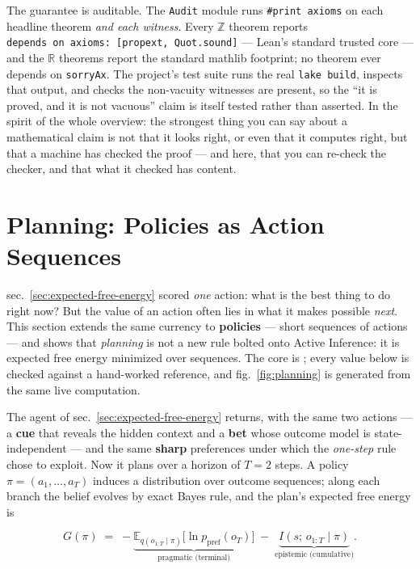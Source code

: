 \documentclass[
  english,
]{article}
\begin{document}
The guarantee is auditable. The \texttt{Audit} module runs
\texttt{\#print\ axioms} on each headline theorem \emph{and each
witness}. Every \texorpdfstring{\ensuremath{\mathbb{Z}}}{Z} theorem reports
\texttt{depends\ on\ axioms:\ {[}propext,\ Quot.sound{]}} --- Lean's
standard trusted core --- and the \texorpdfstring{\ensuremath{\mathbb{R}}}{R} theorems report the standard mathlib
footprint; no theorem ever depends on \texttt{sorryAx}. The project's
test suite runs the real \texttt{lake\ build}, inspects that output, and
checks the non-vacuity witnesses are present, so the ``it is proved, and
it is not vacuous'' claim is itself tested rather than asserted. In the
spirit of the whole overview: the strongest thing you can say about a
mathematical claim is not that it looks right, or even that it computes
right, but that a machine has checked the proof --- and here, that you
can re-check the checker, and that what it checked has content.

\newpage

\section{Planning: Policies as Action Sequences}\label{sec:planning}

sec.~\ref{sec:expected-free-energy} scored \emph{one} action: what is
the best thing to do right now? But the value of an action often lies in
what it makes possible \emph{next}. This section extends the same
currency to \textbf{policies} --- short sequences of actions --- and
shows that \emph{planning} is not a new rule bolted onto Active
Inference: it is expected free energy minimized over sequences. The core
is ; every value below is checked
against a hand-worked reference, and fig.~\ref{fig:planning} is
generated from the same live computation.

The agent of sec.~\ref{sec:expected-free-energy} returns, with the same
two actions --- a \textbf{cue} that reveals the hidden context and a
\textbf{bet} whose outcome model is state-independent --- and the same
\textbf{sharp} preferences under which the \emph{one-step} rule chose to
exploit. Now it plans over a horizon of \(T = 2\) steps. A policy
\(\pi = (a_1, \dots, a_T)\) induces a distribution over outcome
sequences; along each branch the belief evolves by exact Bayes rule, and
the plan's expected free energy is

\[
G(\pi) \;=\; -\underbrace{\mathbb{E}_{q(o_{1:T}\mid\pi)}\big[\ln p_{\text{pref}}(o_T)\big]}_{\text{pragmatic (terminal)}}
\;-\; \underbrace{I(s;\, o_{1:T} \mid \pi)}_{\text{epistemic (cumulative)}}.
\]
\end{document}
